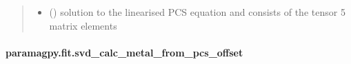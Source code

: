 \documentclass[a4paper,10pt,english,openany,oneside]{sphinxmanual}
\begin{document}
\begin{fulllineitems}
\begin{quote}
\begin{description}
\begin{itemize}
\item {} 
\sphinxAtStartPar
{} () \textendash{} solution to the linearised PCS equation and
consists of the tensor 5 matrix elements

\end{itemize}


\end{description}\end{quote}

\end{fulllineitems}



\paragraph{paramagpy.fit.svd\_calc\_metal\_from\_pcs\_offset}
\label{\detokenize{reference/generated/paramagpy.fit.svd_calc_metal_from_pcs_offset:paramagpy-fit-svd-calc-metal-from-pcs-offset}}\label{\detokenize{reference/generated/paramagpy.fit.svd_calc_metal_from_pcs_offset::doc}}
\end{document}
